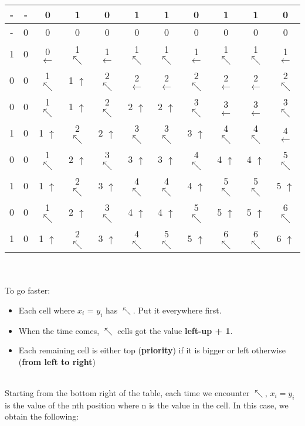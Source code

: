 \documentclass[11pt]{article}
\begin{document}
\begin{enumerate}
    \begin{tabular}{ c | c c c c c c c c c c } 
        - & - & 0 & 1 & 0 & 1 & 1 & 0 & 1 & 1 & 0 \\
        \hline
        - & 0 & 0 & 0 & 0 & 0 & 0 & 0 & 0 & 0 & 0 \\
        1 & 0 & 0 $\leftarrow$ & 1 $\nwarrow$ & 1 $\leftarrow$ & 1 $\nwarrow$ & 1 $\nwarrow$ & 1 $\leftarrow$ & 1 $\nwarrow$ & 1 $\nwarrow$ & 1 $\leftarrow$ \\
        0 & 0 & 1 $\nwarrow$ & 1 $\uparrow$ & 2 $\nwarrow$ & 2 $\leftarrow$ & 2 $\leftarrow$ & 2 $\nwarrow$ & 2 $\leftarrow$ & 2 $\leftarrow$ & 2 $\nwarrow$ \\
        0 & 0 & 1 $\nwarrow$ & 1 $\uparrow$ & 2 $\nwarrow$ & 2 $\uparrow$ & 2 $\uparrow$ & 3 $\nwarrow$ & 3 $\leftarrow$ & 3 $\leftarrow$ & 3 $\nwarrow$ \\
        1 & 0 & 1 $\uparrow$ & 2 $\nwarrow$ & 2 $\uparrow$ & 3 $\nwarrow$ & 3 $\nwarrow$ & 3 $\uparrow$ & 4 $\nwarrow$ & 4 $\nwarrow$ & 4 $\leftarrow$ \\
        0 & 0 & 1 $\nwarrow$ & 2 $\uparrow$ & 3 $\nwarrow$ & 3 $\uparrow$ & 3 $\uparrow$ & 4 $\nwarrow$ & 4 $\uparrow$ & 4 $\uparrow$ & 5 $\nwarrow$ \\
        1 & 0 & 1 $\uparrow$ & 2 $\nwarrow$ & 3 $\uparrow$ & 4 $\nwarrow$ & 4 $\nwarrow$ & 4 $\uparrow$ & 5 $\nwarrow$ & 5 $\nwarrow$ & 5 $\uparrow$ \\
        0 & 0 & 1 $\nwarrow$ & 2 $\uparrow$ & 3 $\nwarrow$ & 4 $\uparrow$ & 4 $\uparrow$ & 5 $\nwarrow$ & 5 $\uparrow$ & 5 $\uparrow$ & 6 $\nwarrow$ \\
        1 & 0 & 1 $\uparrow$ & 2 $\nwarrow$ & 3 $\uparrow$ & 4 $\nwarrow$ & 5 $\nwarrow$ & 5 $\uparrow$ & 6 $\nwarrow$ & 6 $\nwarrow$ & 6 $\uparrow$ \\
    \end{tabular}
    \\\\ To go faster:    
    \begin{itemize}
        \item Each cell where $x_i$ = $y_i$ has $\nwarrow$. Put it everywhere first.
        \item When the time comes, $\nwarrow$ cells got the value \textbf{left-up + 1}.
        \item Each remaining cell is either top (\textbf{priority}) if it is bigger or left otherwise (\textbf{from left to right})
    \end{itemize}
    \\ Starting from the bottom right of the table, each time we encounter $\nwarrow$, $x_i = y_i$ is the value of the nth position where n is the value in the cell. In this case, we obtain the following:

\end{enumerate}
\end{document}
